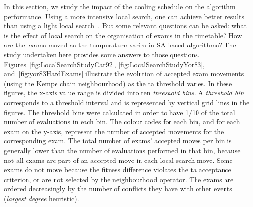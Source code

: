 In this section, we study the impact of the cooling schedule on the algorithm performance. Using a more intensive local search, one can achieve better results than using a light local search~\cite{Dowsland2012}. But some relevant questions can be asked: what is the effect of local search on the organisation of exams in the timetable? How are the exams moved as the temperature varies in SA based algorithms? The study undertaken here provides some answers to those questions. Figures~\ref{fig:LocalSearchStudyCar92}, \ref{fig:LocalSearchStudyYor83}, and~\ref{fig:yor83HardExams} illustrate the evolution of accepted exam movements (using the Kempe chain neighbourhood) as the \gls{ta} threshold varies. In these figures, the x-axis value range is divided into ten \textit{threshold bins}. A \textit{threshold bin} corresponds to a threshold interval and is represented by vertical grid lines in the figures. The threshold bins were calculated in order to have 1/10 of the total number of evaluations in each bin. The colour codes for each bin, and for each exam on the y-axis, represent the number of accepted movements for the corresponding exam. The total number of exams' accepted moves per bin is generally lower than the number of evaluations performed in that bin, because not all exams are part of an accepted move in each local search move. Some exams do not move because the fitness difference violates the \gls{ta} acceptance criterion, or are not selected by the neighbourhood operator. The exams are ordered decreasingly by the number of conflicts they have with other events (\textit{largest degree} heuristic).





